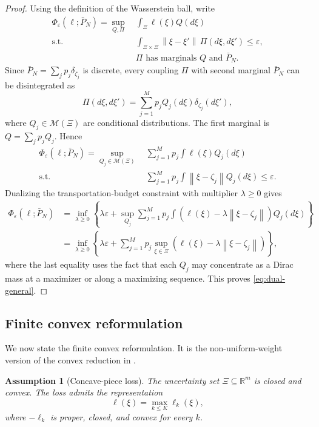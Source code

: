 \documentclass[11pt]{article}
\newtheorem{assumption}[theorem]{Assumption}
\newcommand{\R}{\mathbb{R}}
\newcommand{\cM}{\mathcal{M}}
\newcommand{\XiSet}{\Xi}
\newcommand{\1}{\mathbf{1}}
\newcommand{\Pbar}{\bar P_N}
\newcommand{\norm}[1]{\left\lVert #1\right\rVert}
\begin{document}
\begin{proof}
Using the definition of the Wasserstein ball, write
\begin{align*}
\Phi_{\varepsilon}(\ell;\Pbar)
=\sup_{Q,\Pi}\ &\int_{\XiSet}\ell(\xi)Q(d\xi)\\
\text{s.t. }&\int_{\XiSet\times\XiSet}\norm{\xi-\xi'}\,\Pi(d\xi,d\xi')\le\varepsilon,\\
&\Pi\text{ has marginals }Q\text{ and }\Pbar.
\end{align*}
Since $\Pbar=\sum_jp_j\delta_{\zeta_j}$ is discrete, every coupling $\Pi$ with second marginal $\Pbar$ can be disintegrated as
\begin{equation}
    \Pi(d\xi,d\xi')=\sum_{j=1}^Mp_jQ_j(d\xi)\delta_{\zeta_j}(d\xi'),
\end{equation}
where $Q_j\in\cM(\XiSet)$ are conditional distributions. The first marginal is $Q=\sum_jp_jQ_j$. Hence
\begin{align*}
\Phi_{\varepsilon}(\ell;\Pbar)
=\sup_{Q_j\in\cM(\XiSet)}\ &\sum_{j=1}^Mp_j\int\ell(\xi)Q_j(d\xi)\\
\text{s.t. }&\sum_{j=1}^Mp_j\int\norm{\xi-\zeta_j}Q_j(d\xi)\le\varepsilon.
\end{align*}
Dualizing the transportation-budget constraint with multiplier $\lambda\ge0$ gives
\begin{align*}
\Phi_{\varepsilon}(\ell;\Pbar)
&=\inf_{\lambda\ge0}\left\{\lambda\varepsilon+
\sup_{Q_j}\sum_{j=1}^Mp_j\int\left(\ell(\xi)-\lambda\norm{\xi-\zeta_j}\right)Q_j(d\xi)\right\}\\
&=\inf_{\lambda\ge0}\left\{\lambda\varepsilon+
\sum_{j=1}^Mp_j\sup_{\xi\in\XiSet}\left(\ell(\xi)-\lambda\norm{\xi-\zeta_j}\right)\right\},
\end{align*}
where the last equality uses the fact that each $Q_j$ may concentrate as a Dirac mass at a maximizer or along a maximizing sequence. This proves \eqref{eq:dual-general}.
\end{proof}

\subsection{Finite convex reformulation}

We now state the finite convex reformulation. It is the non-uniform-weight version of the convex reduction in \citet{esfahani2018data}.

\begin{assumption}[Concave-piece loss]\label{ass:concave-piece}
The uncertainty set $\XiSet\subseteq\R^m$ is closed and convex. The loss admits the representation
\begin{equation}\label{eq:max-concave}
    \ell(\xi)=\max_{k\le K}\ell_k(\xi),
\end{equation}
where $-\ell_k$ is proper, closed, and convex for every $k$.
\end{assumption}
\end{document}

